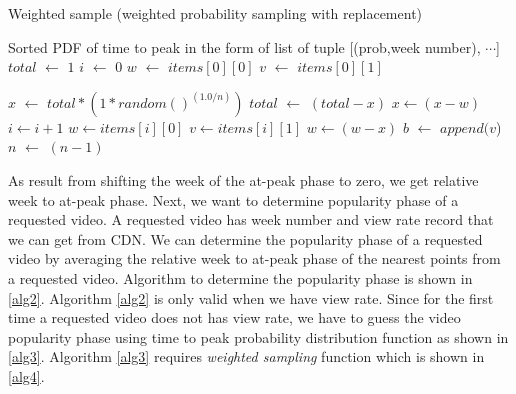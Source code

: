 \documentclass[10pt,final,journal,a4paper]{IEEEtran}
\begin{document}
\begin{algorithm}
\caption{Weighted sample (weighted probability sampling with replacement)}
\label{alg4}
\begin{algorithmic}[2]
\REQUIRE Sorted PDF of time to peak in the form of list of tuple [(prob,week number), $\cdots$]
\STATE $total$  $\leftarrow$ $1$
\STATE $i$ $\leftarrow$ $0$ 
\STATE $w$ $\leftarrow$ $items[0][0]$ 
\STATE $v$ $\leftarrow$ $items[0][1]$ 

\STATE $x$ $\leftarrow$ $total * (1*random() ^ {(1.0/n)})$
\STATE $total$ $\leftarrow$ $(total - x)$
\STATE $x \leftarrow (x-w)$
\STATE $i \leftarrow i+1$
\STATE $w \leftarrow items[i][0]$
\STATE $v \leftarrow items[i][1]$
\ENDWHILE
\STATE $w \leftarrow (w-x)$
\STATE $b$ $\leftarrow$ $append(v$) 
\STATE $n$ $\leftarrow$ $(n-1)$
\ENDWHILE

\end{algorithmic}
\end{algorithm}

As result from shifting the week of the at-peak phase to zero, we get relative week to at-peak phase. 
Next, we want to determine popularity phase of a requested video.  
A requested video has week number and view rate record that we can get from CDN. 
We can determine the popularity phase of a requested video by averaging the relative week to at-peak phase of the nearest points from a requested video.  
Algorithm to determine the popularity phase is shown in \ref{alg2}. 
Algorithm \ref{alg2} is only valid when we have view rate.
Since for the first time a requested video does not has view rate, we have to guess the video popularity phase using time to peak probability distribution function as shown in \ref{alg3}. 
Algorithm \ref{alg3} requires \textit{weighted sampling} function which is shown in \ref{alg4}.
\end{document}
